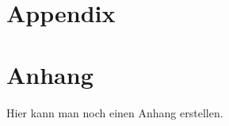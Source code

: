 \cleardoublepage
\
\ifdocenglish
    \chapter{Appendix}
\else
    \chapter{Anhang}
\fi
\label{app:Anhang_A}

Hier kann man noch einen Anhang erstellen. 

